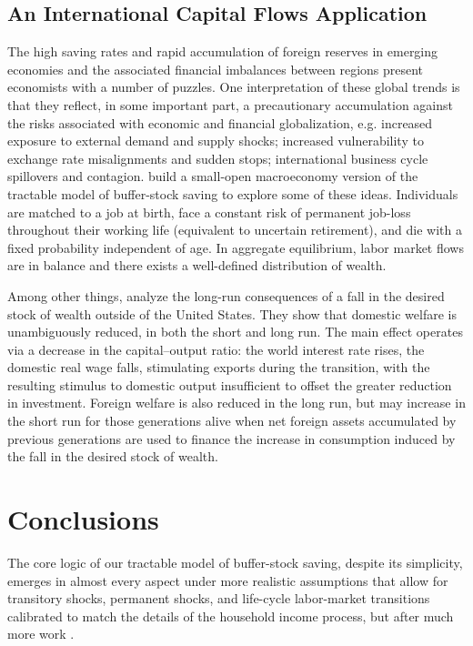 \documentclass[titlepage,abstract]{\econtex}\newcommand{\texname}{ctDiscrete}
\begin{document}
\subsection{An International Capital Flows Application \label{sec:macro} }
The high saving rates and rapid accumulation of foreign reserves in emerging economies and the associated financial imbalances between regions present economists with a number of puzzles. One interpretation of these global trends is that they reflect, in some important part, a precautionary accumulation against the risks associated with economic and financial globalization, e.g. increased exposure to external demand and supply shocks; increased vulnerability to exchange rate misalignments and sudden stops; international business cycle spillovers and contagion. \cite{cjSOE} build a small-open macroeconomy version of the tractable model of buffer-stock saving to explore some of these ideas. Individuals are matched to a job at birth, face a constant risk of permanent job-loss throughout their working life (equivalent to uncertain retirement), and die with a fixed probability independent of age. In aggregate equilibrium, labor market flows are in balance and there exists a well-defined distribution of wealth. 

Among other things, \cite{cjSOE} analyze the long-run consequences of a fall in the desired stock of wealth outside of the United States. They show that domestic welfare is unambiguously reduced, in both the short and long run. The main effect operates via a decrease in the capital--output ratio: the world interest rate rises, the domestic real wage falls, stimulating exports during the transition, with the resulting stimulus to domestic output insufficient to offset the greater reduction in investment. Foreign welfare is also reduced in the long run, but may increase in the short run for those generations alive when net foreign assets accumulated by previous generations are used to finance the increase in consumption induced by the fall in the desired stock of wealth.


\section{Conclusions}
The core logic of our tractable model of buffer-stock saving, 
despite its simplicity,
emerges in almost every aspect
under more realistic assumptions that allow for 
transitory shocks, permanent shocks, 
and life-cycle labor-market transitions
calibrated to match the details of the household income process, 
but after much more work \citep{BufferStockTheory}.
\end{document}

